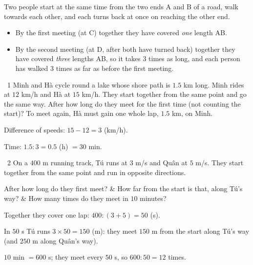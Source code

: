 \gap
{}
\begin{knowbox}
Two people start at the same time from the two ends A and B of a road, walk towards each other, and each turns back at once on reaching the other end.
\begin{center}
\end{center}
\begin{itemize}[leftmargin=1.4em,itemsep=3pt]
\item By the first meeting (at C) together they have covered \emph{one} length AB.
\item By the second meeting (at D, after both have turned back) together they have covered \emph{three} lengths AB, so it takes $3$ times as long, and each person has walked $3$ times as far as before the first meeting.
\end{itemize}
\end{knowbox}
\gap
\begin{exbox}{\ExWord\ 1}
Minh and Hà cycle round a lake whose shore path is $1.5$ km long. Minh rides at $12$ km/h and Hà at $15$ km/h. They start together from the same point and go the same way. After how long do they meet for the first time (not counting the start)?
\guide
To meet again, Hà must gain one whole lap, $1.5$ km, on Minh.\par
Difference of speeds: $15-12=3$ (km/h).\par
Time: $1.5:3=0.5$ (h) $=30$ min.
\end{exbox}
\gap
\begin{exbox}{\ExWord\ 2}
On a $400$ m running track, Tú runs at $3$ m/s and Quân at $5$ m/s. They start together from the same point and run in opposite directions.
\begin{cols3}
 After how long do they first meet? &  How far from the start is that, along Tú's way? &  How many times do they meet in $10$ minutes?
\end{cols3}
\guide
{} Together they cover one lap: $400:(3+5)=50$ (s).\par
{} In $50$ s Tú runs $3\times50=150$ (m): they meet $150$ m from the start along Tú's way (and $250$ m along Quân's way).\par
{} $10$ min $=600$ s; they meet every $50$ s, so $600:50=12$ times.
\end{exbox}
